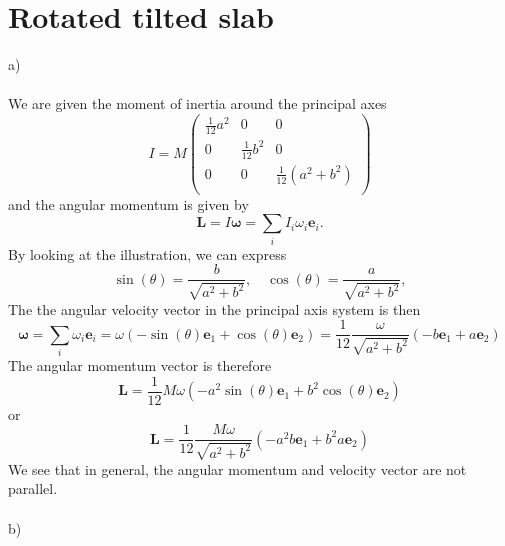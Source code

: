 \documentclass{article}
\begin{document}
    \section{Rotated tilted slab}
        a) \\ \\  
        We are given the moment of inertia around the principal axes
        \begin{equation*}
            I = M
            \begin{pmatrix}
                \frac{1}{12} a^2& 0 & 0 \\
                0 & \frac{1}{12} b^2 & 0 \\
                0 & 0 & \frac{1}{12} (a^2 + b^2)\\
            \end{pmatrix}
        \end{equation*}
        and the angular momentum is given by
        \begin{equation*}
            \mathbf{L} = I \mathbf{\omega} = \sum_i  I_i \omega_i  \mathbf{e}_i.
        \end{equation*}
        By looking at the illustration, we can express
        \begin{equation*}
            \sin(\theta) = \frac{b}{\sqrt{a^2 + b^2}}, \quad \cos(\theta) = \frac{a}{\sqrt{a^2 + b^2}},
        \end{equation*}
        The the angular velocity vector in the principal axis system is then
        \begin{equation*}
            \boldsymbol{\omega} = \sum_i \omega_i \mathbf{e}_i = \omega (-\sin(\theta) \mathbf{e}_1 + \cos(\theta) \mathbf{e}_2) = \frac{1}{12}\frac{\omega}{\sqrt{a^2 + b^2}}(-b \mathbf{e}_1 + a \mathbf{e}_2)
        \end{equation*}
        The angular momentum vector is therefore
        \begin{equation*}
            \mathbf{L} = \frac{1}{12} M \omega(-a^2\sin(\theta) \mathbf{e}_1 + b^2\cos(\theta) \mathbf{e}_2)
        \end{equation*}
        or
        \begin{equation*}
            \mathbf{L} = \frac{1}{12}\frac{M \omega}{\sqrt{a^2 + b^2}}(-a^2b \mathbf{e}_1 + b^2a \mathbf{e}_2)
        \end{equation*} 
        We see that in general, the angular momentum and velocity vector are not parallel. 
        \\ \\
        b) \\ \\
\end{document}
